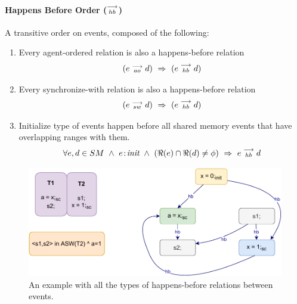     \paragraph{Happens Before Order ($\stackrel{\longrightarrow}{_{hb}}$)}
        A transitive order on events, composed of the following:
        
        \begin{enumerate}
            \item Every agent-ordered relation is also a happens-before relation 
                \begin{align*}
                    (\reln{e}{ao}{d}) \ \Rightarrow{} \ (\reln{e}{hb}{d})    
                \end{align*}
                
            \item Every synchronize-with relation is also a happens-before relation 
                \begin{align*}
                    (\reln{e}{sw}{d}) \ \Rightarrow{} \ (\reln{e}{hb}{d})    
                \end{align*}
                 
            \item Initialize type of events happen before all shared memory events that have overlapping ranges with them. 
                \begin{align*}
                    \forall e,d \in SM \ \wedge \ 
                    \et{e}{init} \ \wedge \ 
                    (\Re(e) \cap \Re(d) \neq \phi)
                    \ \Rightarrow{} \ 
                    \reln{e}{hb}{d}
                \end{align*}          
        \end{enumerate}
    
        \begin{figure}[H]
            \centering
            \includegraphics[scale=0.7]{ECMAScriptMemoryModel/Happens-before.pdf}
            \caption{An example with all the types of happens-before relations between events.}
        \end{figure}

